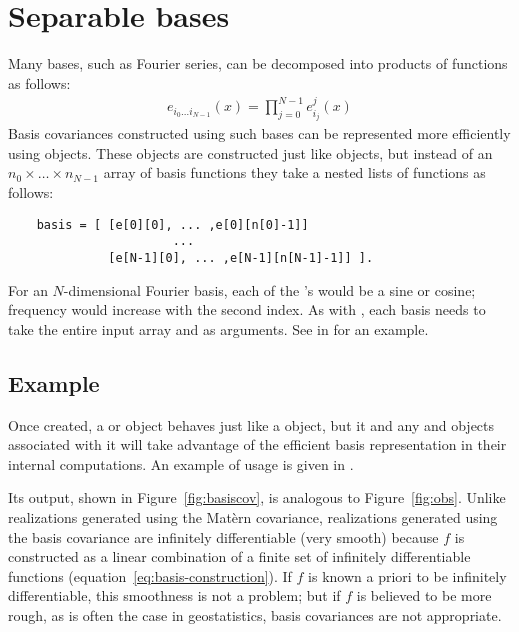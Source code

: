 \documentclass[article]{jss}
\begin{document}
\section{Separable bases}

Many bases, such as Fourier series, can be decomposed into products of functions as follows:
\begin{eqnarray*}
    e_{i_0\ldots i_{N-1}}(x) = \prod_{j=0}^{N-1}e_{i_j}^j(x)
\end{eqnarray*}
Basis covariances constructed using such bases can be represented more efficiently using  objects. These objects are constructed just like  objects, but instead of an $n_0\times \ldots \times n_{N-1}$ array of basis functions they take a nested lists of functions as follows:
\begin{verbatim}
    basis = [ [e[0][0], ... ,e[0][n[0]-1]]
                       ...
              [e[N-1][0], ... ,e[N-1][n[N-1]-1]] ].
\end{verbatim}
For an $N$-dimensional Fourier basis, each of the 's would be a sine or cosine; frequency would increase with the second index. As with , each basis needs to take the entire input array  and  as arguments. See  in  for an example.

\subsection{Example}

Once created, a  or  object behaves just like a  object, but it and any  and  objects associated with it will take advantage of the efficient basis representation in their internal computations. An example of  usage is given in . 

Its output, shown in Figure~\ref{fig:basiscov}, is analogous to Figure~\ref{fig:obs}. Unlike realizations generated using the Mat\`ern covariance, realizations generated using the basis covariance are infinitely differentiable (very smooth) because $f$ is constructed as a linear combination of a finite set of infinitely differentiable functions (equation~\ref{eq:basis-construction}). If $f$ is known a priori to be infinitely differentiable, this smoothness is not a problem; but if $f$ is believed to be more rough, as is often the case in geostatistics, basis covariances are not appropriate.
\end{document}
